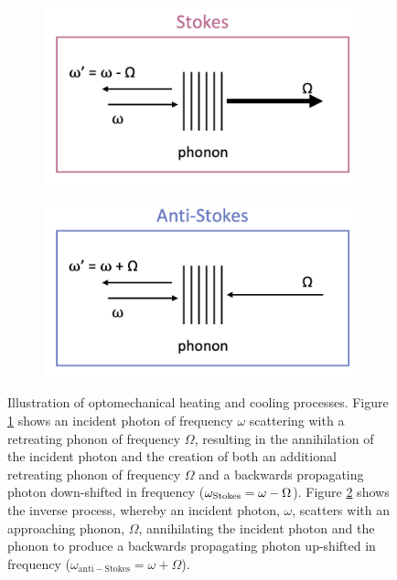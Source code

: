 \begin{figure}[t]
    \centering
    \begin{subfigure}[b]{0.49\textwidth}
        \centering
        \includegraphics[width=\textwidth]{figs/2-Cooling/StokesHeatingProcess.png}
        \caption{}
        \label{fig:Cooling:StokesHeating}
    \end{subfigure}
    \hfill
    \begin{subfigure}[b]{0.49\textwidth}
        \centering
        \includegraphics[width=\textwidth]{figs/2-Cooling/anti-StokesCoolingProcess.png}
        \caption{}
        \label{fig:Cooling:anti-StokesCooling}
    \end{subfigure}
    \caption[Illustration of optomechanical heating and cooling processes.]{Illustration of optomechanical heating and cooling processes. Figure \ref{fig:Cooling:StokesHeating} shows an incident photon of frequency \(\omega\) scattering with a retreating phonon of frequency \(\Omega\), resulting in the annihilation of the incident photon and the creation of both an additional retreating phonon of frequency \(\Omega\) and a backwards propagating photon down-shifted in frequency (\(\omega_{\rm Stokes} = \omega - \Omega\)). Figure \ref{fig:Cooling:anti-StokesCooling} shows the inverse process, whereby an incident photon, \(\omega\), scatters with an approaching phonon, \(\Omega\), annihilating the incident photon and the phonon to produce a backwards propagating photon up-shifted in frequency (\(\omega_{\mathrm{anti-Stokes}} = \omega + \Omega\)).}
    \label{fig:Cooling:StokesProcesses}
\end{figure}

